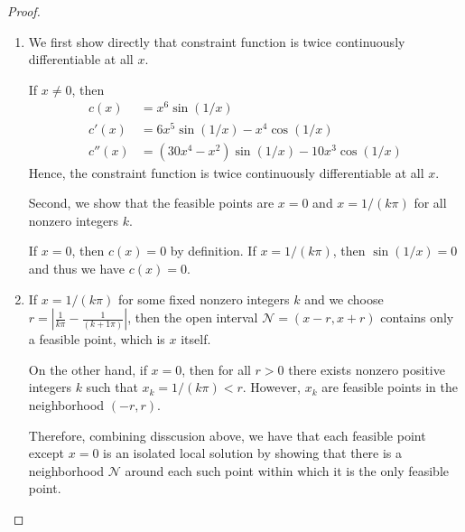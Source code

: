 \documentclass[11pt,a4paper]{article}
\renewcommand{\(}{\left(}
\renewcommand{\)}{\right)}
\begin{document}
  \begin{proof}
  	\begin{enumerate}
  		\item We first show directly that constraint function is twice continuously differentiable at all $x$.
  		
  		If $x \ne 0$, then
  		\begin{align*}
	  		c(x) &= x^6 \sin(1/x)\\
	  		c'(x) &= 6x^5\sin(1/x) - x^4\cos(1/x)\\
	  		c''(x) &= (30x^4 - x^2)\sin(1/x) - 10x^3\cos(1/x)
  		\end{align*}
  		Hence, the constraint function is twice continuously differentiable at all $x$.
  		
  		Second, we show that the feasible points are $x = 0$ and $x = 1/(k\pi)$ for all nonzero integers $k$.
  		
  		If $x = 0$, then $c(x) = 0$ by definition.
  		If $x = 1/(k\pi)$, then $\sin(1/x) = 0$ and thus we have $c(x) = 0$.
  		\item If $x = 1/(k\pi)$ for some fixed nonzero integers $k$ and we choose $r = \left|\frac{1}{k\pi}-\frac{1}{(k+1\pi)}\right|$, then the open interval $\mathcal{N} = (x-r, x+r)$ contains only a feasible point, which is $x$ itself. 
  		
  		On the other hand, if $x = 0$, then for all $r>0$ there exists nonzero positive integers $k$ such that $x_k = 1/(k\pi)<r$. However, $x_k$ are feasible points in the neighborhood $(-r,r)$.
  		
  		Therefore, combining disscusion above, we have that each feasible point except $x = 0$ is an isolated local solution by showing that there is a neighborhood $\mathcal{N}$ around each such point within which it is the only feasible point.
  	\end{enumerate}
  \end{proof}
  \newpage
  
\end{document}
